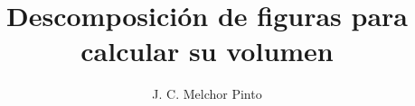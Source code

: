 \documentclass[12pt]{guia}
\title{Descomposición de figuras para calcular su volumen}
\author{J. C. Melchor Pinto}
\begin{document}
\pagestyle{headandfoot}
\addpoints
\INFO
\printanswers
\begin{questions}
    
    
    
    \newpage
    
    \newpage
    
    \newpage
    
    \newpage
    
    \newpage

    
    
    
    
    \newpage
    
    
    
    
    
\end{questions}

\end{document}
